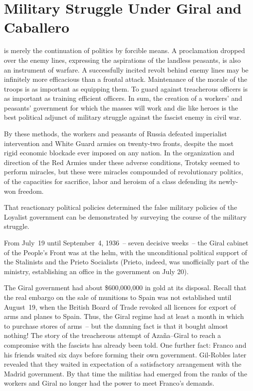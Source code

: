 \chapter{Military Struggle Under Giral and Caballero}

 is merely the continuation of politics by forcible means. A proclamation dropped over the enemy lines, expressing the aspirations of the landless peasants, is also an instrument of warfare. A successfully incited revolt behind enemy lines may be infinitely more efficacious than a frontal attack. Maintenance of the morale of the troops is as important as equipping them. To guard against treacherous officers is as important as training efficient officers. In sum, the creation of a workers’ and peasants’ government for which the masses will work and die like heroes is the best political adjunct of military struggle against the fascist enemy in civil war\kn.

By these methods, the workers and peasants of Russia defeated imperialist intervention and White Guard armies on twenty-two fronts, despite the most rigid economic blockade ever imposed on any nation. In the organization and direction of the Red Armies under these adverse conditions, Trotsky seemed to perform miracles, but these were miracles compounded of revolutionary politics, of the capacities for sacrifice, labor and heroism of a class defending its newly-won freedom.

That reactionary political policies determined the false military policies of the Loyalist government can be demonstrated by surveying the course of the military struggle.

\indexIPrieto
From July~19 until September~4, 1936~-- seven decisive weeks~-- the Giral cabinet of the People’s Front was at the helm, with the unconditional political support of the Stalinists and the Prieto Socialists (Prieto, indeed, was unofficially part of the ministry, establishing an office in the government on July 20).

\indexJGiral\indexGRobles{}
The Giral government had about \textsc{\$600,000,000} in gold at its disposal. Recall that the real embargo on the sale of munitions to Spain was not established until August~19, when the British Board of Trade revoked all licences for export of arms and planes to Spain. Thus, the Giral regime had at least a month in which to purchase stores of arms~-- but the damning fact is that it bought almost nothing! The story of the treacherous attempt of Azaña--Giral to reach a compromise with the fascists has already been told. One further fact: Franco and his friends waited six days before forming their own government. Gil-Robles later revealed that they waited in expectation of a satisfactory arrangement with the Madrid government. By that time the militias had emerged from the ranks of the workers and Giral no longer had the power to meet Franco’s demands.

